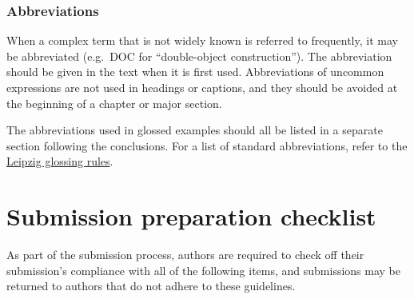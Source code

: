 \documentclass[cm,linguex]{glossa}
\begin{document}
\hypertarget{abbreviations}{%
\subsubsection{Abbreviations}\label{abbreviations}}

When a complex term that is not widely known is referred to frequently,
it may be abbreviated (e.g.~DOC for ``double-object construction''). The
abbreviation should be given in the text when it is first used.
Abbreviations of uncommon expressions are not used in headings or
captions, and they should be avoided at the beginning of a chapter or
major section.

The abbreviations used in glossed examples should all be listed in a
separate section following the conclusions. For a list of standard
abbreviations, refer to the
\href{https://www.eva.mpg.de/lingua/resources/glossing-rules.php}{Leipzig
glossing rules}.

\hypertarget{submission-preparation-checklist}{%
\section{Submission preparation
checklist}\label{submission-preparation-checklist}}

As part of the submission process, authors are required to check off
their submission's compliance with all of the following items, and
submissions may be returned to authors that do not adhere to these
guidelines.
\end{document}
